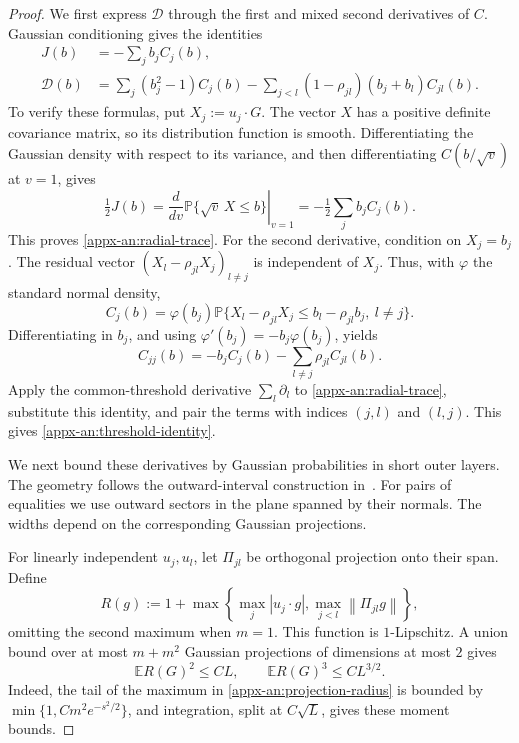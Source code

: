 \documentclass[11pt,letterpaper]{article}
\theoremstyle{remark}
\newcommand{\E}{\mathbb E}
\newcommand{\Pp}{\mathbb P}
\newcommand{\norm}[1]{\left\lVert#1\right\rVert}
\begin{document}
\begin{proof}
We first express \(\mathcal D\) through the first and mixed second
derivatives of \(C\). Gaussian conditioning gives the identities
\begin{align}
 J(b)&=-\sum_j b_jC_j(b),\label{appx-an:radial-trace}\\
 \mathcal D(b)
 &=\sum_j(b_j^2-1)C_j(b)
   -\sum_{j<l}(1-\rho_{jl})(b_j+b_l)C_{jl}(b).
 \label{appx-an:threshold-identity}
\end{align}
To verify these formulas, put \(X_j:=u_j\cdot G\).
The vector \(X\) has a positive definite covariance matrix, so its
distribution function is smooth. Differentiating the Gaussian
density with respect to its variance, and then differentiating
\(C(b/\sqrt v)\) at \(v=1\), gives
\[
 \tfrac12J(b)
 =\left.\frac{d}{dv}\Pp\{\sqrt v\,X\le b\}\right|_{v=1}
 =-\tfrac12\sum_j b_jC_j(b).
\]
This proves \eqref{appx-an:radial-trace}. For the second derivative, condition
on \(X_j=b_j\). The residual vector
\((X_l-\rho_{jl}X_j)_{l\ne j}\) is independent of \(X_j\).
Thus, with \(\varphi\) the standard normal density,
\[
 C_j(b)=\varphi(b_j)
 \Pp\{X_l-\rho_{jl}X_j\le b_l-\rho_{jl}b_j,\ l\ne j\}.
\]
Differentiating in \(b_j\), and using
\(\varphi'(b_j)=-b_j\varphi(b_j)\), yields
\[
 C_{jj}(b)=-b_jC_j(b)-\sum_{l\ne j}\rho_{jl}C_{jl}(b).
\]
Apply the common-threshold derivative \(\sum_l\partial_l\) to
\eqref{appx-an:radial-trace}, substitute this identity, and pair the terms with
indices \((j,l)\) and \((l,j)\). This gives
\eqref{appx-an:threshold-identity}. %

We next bound these derivatives by Gaussian probabilities in short
outer layers. The geometry follows the outward-interval construction
in~\cite{Nazarov2003,CCK17N}. For pairs of equalities we use outward
sectors in the plane spanned by their normals. The widths depend on
the corresponding Gaussian projections.

For linearly independent \(u_j,u_l\), let \(\Pi_{jl}\) be orthogonal projection
onto their span. Define
\begin{equation}
 R(g):=1+\max\left\{\max_j|u_j\cdot g|,
                          \max_{j<l}\norm{\Pi_{jl}g}\right\},
 \label{appx-an:projection-radius}
\end{equation}
omitting the second maximum when \(m=1\).
This function is \(1\)-Lipschitz. A union bound over at most \(m+m^2\)
Gaussian projections of dimensions at most \(2\) gives
\begin{equation}
 \E R(G)^2\le CL,\qquad \E R(G)^3\le CL^{3/2}.
 \label{appx-an:projection-moments}
\end{equation}
Indeed, the tail of the maximum in \eqref{appx-an:projection-radius} is bounded by
\(\min\{1,Cm^2e^{-s^2/2}\}\), and integration, split at \(C\sqrt L\),
gives these moment bounds.



\end{proof}
\end{document}
